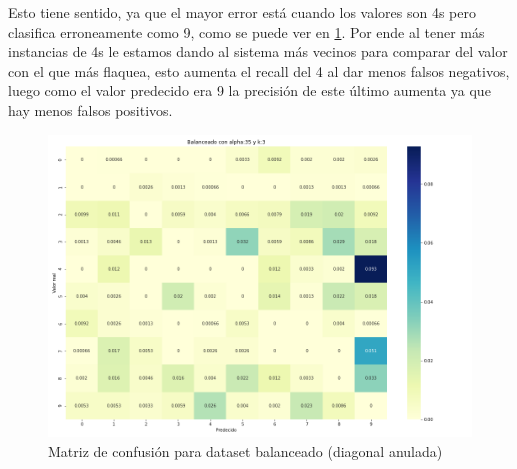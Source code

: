 Esto tiene sentido, ya que el mayor error está cuando los valores son 4s pero clasifica erroneamente como 9, como se puede ver en \ref{fig:bal_conf}. Por ende al tener más instancias de 4s le estamos dando al sistema más vecinos para comparar del valor con el que más flaquea, esto aumenta el recall del 4 al dar menos falsos negativos, luego como el valor predecido era 9 la precisión de este último aumenta ya que hay menos falsos positivos.
\begin{figure}[h]
 \centering
 \includegraphics[width=0.8\linewidth]{images/balanceo/Balanceado con alpha:35 y k:3_3795.png}
 \caption{Matriz de confusión para dataset balanceado (diagonal anulada)}
 \label{fig:bal_conf}
\end{figure}

